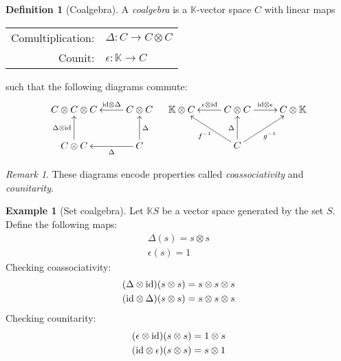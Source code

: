 \documentclass{article}
\theoremstyle{definition}
\newtheorem{Definition}{Definition}
\newtheorem{Example}{Example}
\theoremstyle{remark}
\newtheorem*{Remark*}{Remark}
\theoremstyle{underline}
\theoremstyle{underline}
\newcommand{\id}{\mathrm{id}}
\begin{document}
	\begin{Definition}[Coalgebra]
		A \emph{coalgebra} is a $\mathbb K$-vector space $C$ with linear maps
		\begin{center}
			\begin{tabular}{rl}
		 		Comultiplication: & $\Delta \colon C \rightarrow C \otimes C$ \\
		 		Counit: & $ \epsilon \colon \mathbb K \rightarrow C$ 
		\end{tabular}
		\end{center}
		such that the following diagrams commute:
		\begin{align*}
		\xymatrix{
			C \otimes C \otimes C & C \otimes C \ar[l]_-{\id \otimes \Delta} \\
			C \otimes C \ar[u]^-{\Delta \otimes \id} & C \ar[l]^-{\Delta} \ar[u]_-{\Delta}
		} & &
		\xymatrix{
			\mathbb K \otimes C  & C \otimes C \ar[l]_-{\epsilon \otimes \id} \ar[r]^-{\id \otimes \epsilon} & C \otimes \mathbb K  \\
			& C \ar[u]^-{\Delta} \ar[lu]^-{f^{-1}} \ar[ru]_-{g^{-1}} &	
		}
		\end{align*}
	\end{Definition}
	\begin{Remark*}
		These diagrams encode properties called \emph{coassociativity} and \emph{counitarity}.
	\end{Remark*}
	\begin{Example}[Set coalgebra]
		Let $\mathbb K S$ be a vector space generated by the set $S$. Define the following maps:
		\begin{gather*}
			\Delta(s) = s\otimes s \\
			\epsilon(s) = 1 
		\end{gather*}
		Checking coassociativity:
		\begin{gather*}
			\pqty{\Delta \otimes \id} \pqty{s \otimes s} = s \otimes s \otimes s \\
			\pqty{\id \otimes \Delta} \pqty{s \otimes s} = s \otimes s \otimes s 
		\end{gather*}
		Checking counitarity:
		\begin{gather*}
			\pqty{\epsilon \otimes \id} \pqty{s \otimes s} = 1 \otimes s\\
			\pqty{\id \otimes \epsilon} \pqty{s \otimes s} = s \otimes 1
		\end{gather*}
	\end{Example}
\end{document}
